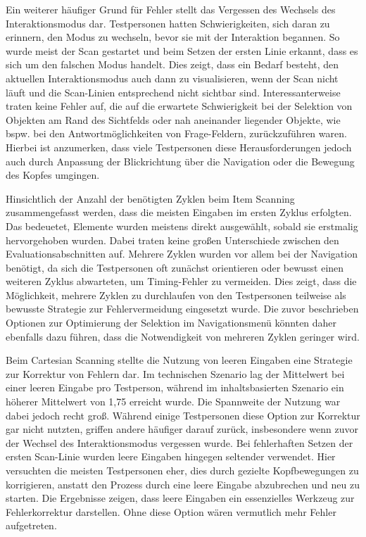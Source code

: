 Ein weiterer häufiger Grund für Fehler stellt das Vergessen des Wechsels des Interaktionsmodus dar. Testpersonen hatten Schwierigkeiten, sich daran zu erinnern, den Modus zu wechseln, bevor sie mit der Interaktion begannen. So wurde meist der Scan gestartet und beim Setzen der ersten Linie erkannt, dass es sich um den falschen Modus handelt. Dies zeigt, dass ein Bedarf besteht, den aktuellen Interaktionsmodus auch dann zu visualisieren, wenn der Scan nicht läuft und die Scan-Linien entsprechend nicht sichtbar sind.
Interessanterweise traten keine Fehler auf, die auf die erwartete Schwierigkeit bei der Selektion von Objekten am Rand des Sichtfelds oder nah aneinander liegender Objekte, wie bspw. bei den Antwortmöglichkeiten von Frage-Feldern, zurückzuführen waren. Hierbei ist anzumerken, dass viele Testpersonen diese Herausforderungen jedoch auch durch Anpassung der Blickrichtung über die Navigation oder die Bewegung des Kopfes umgingen. 

Hinsichtlich der Anzahl der benötigten Zyklen beim Item Scanning zusammengefasst werden, dass die meisten Eingaben im ersten Zyklus erfolgten. Das bedeuetet, Elemente wurden meistens direkt ausgewählt, sobald sie erstmalig hervorgehoben wurden. Dabei traten keine großen Unterschiede zwischen den Evaluationsabschnitten auf. Mehrere Zyklen wurden vor allem bei der Navigation benötigt, da sich die Testpersonen oft zunächst orientieren oder bewusst einen weiteren Zyklus abwarteten, um Timing-Fehler zu vermeiden. Dies zeigt, dass die Möglichkeit, mehrere Zyklen zu durchlaufen von den Testpersonen teilweise als bewusste Strategie zur Fehlervermeidung eingesetzt wurde. Die zuvor beschrieben Optionen zur Optimierung der Selektion im Navigationsmenü könnten daher ebenfalls dazu führen, dass die Notwendigkeit von mehreren Zyklen geringer wird.  

Beim Cartesian Scanning stellte die Nutzung von leeren Eingaben eine Strategie zur Korrektur von Fehlern dar. Im technischen Szenario lag der Mittelwert bei einer leeren Eingabe pro Testperson, während im inhaltsbasierten Szenario ein höherer Mittelwert von 1,75 erreicht wurde. Die Spannweite der Nutzung war dabei jedoch recht groß. Während einige Testpersonen diese Option zur Korrektur gar nicht nutzten, griffen andere häufiger darauf zurück, insbesondere wenn zuvor der Wechsel des Interaktionsmodus vergessen wurde. Bei fehlerhaften Setzen der ersten Scan-Linie wurden leere Eingaben hingegen seltender verwendet. Hier versuchten die meisten Testpersonen eher, dies durch gezielte Kopfbewegungen zu korrigieren, anstatt den Prozess durch eine leere Eingabe abzubrechen und neu zu starten. 
Die Ergebnisse zeigen, dass leere Eingaben ein essenzielles Werkzeug zur Fehlerkorrektur darstellen. Ohne diese Option wären vermutlich mehr Fehler aufgetreten. 


